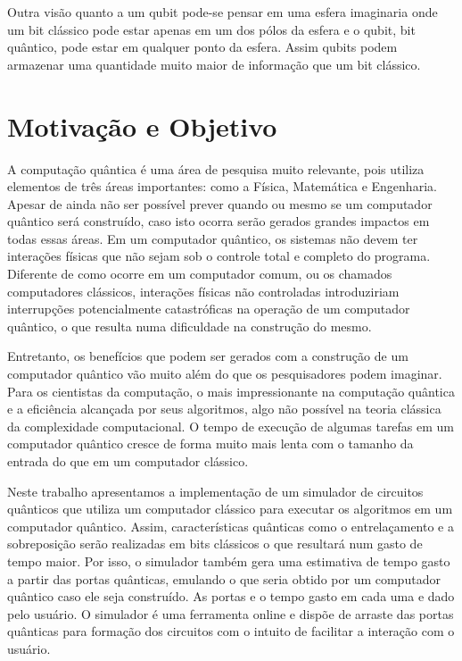 \documentclass[a4paper, 12pt, oneside]{book}
\begin{document}
Outra visão quanto a um qubit pode-se pensar em uma esfera imaginaria onde um bit clássico pode estar apenas em um dos pólos da esfera e o qubit, bit quântico, pode estar em qualquer ponto da esfera. Assim qubits podem armazenar uma quantidade muito maior de informação que um bit clássico.

\section{Motivação e Objetivo}

A computação quântica é uma área de pesquisa muito relevante, pois utiliza elementos de três áreas importantes: como a Física, Matemática e Engenharia. Apesar de ainda não ser possível prever quando ou mesmo se um computador quântico será construído, caso isto ocorra serão gerados grandes impactos em todas essas áreas. Em um computador quântico, os sistemas não devem ter interações físicas que não sejam sob o controle total e completo do programa. Diferente de como ocorre em um computador comum, ou os chamados computadores clássicos, interações físicas não controladas introduziriam interrupções potencialmente catastróficas na operação de um computador quântico, o que resulta numa dificuldade na construção do mesmo. 

Entretanto, os benefícios que podem ser gerados com a construção de um computador quântico vão muito além do que os pesquisadores podem imaginar. Para os cientistas da computação, o mais impressionante na computação quântica e a eficiência alcançada por seus algoritmos, algo não possível na teoria clássica da complexidade computacional. O tempo de execução de algumas tarefas em um computador quântico cresce de forma muito mais lenta com o tamanho da entrada do que em um computador clássico. 

Neste trabalho apresentamos a implementação de um simulador de circuitos quânticos que utiliza um computador clássico para executar os algoritmos em um computador quântico. Assim, características quânticas como o entrelaçamento e a sobreposição serão realizadas em bits clássicos o que resultará num gasto de tempo maior. Por isso, o simulador também gera uma estimativa de tempo gasto a partir das portas quânticas, emulando o que seria obtido por um computador quântico caso ele seja construído. As portas e o tempo gasto em cada uma e dado pelo usuário. O simulador é uma ferramenta online e dispõe de arraste das portas quânticas para formação dos circuitos com o intuito de facilitar a interação com o usuário.
\end{document}
